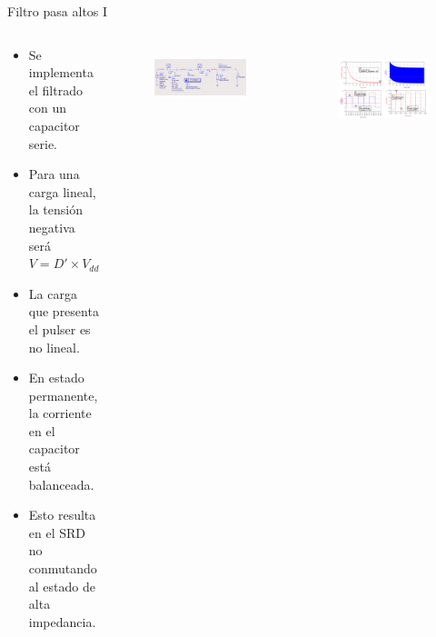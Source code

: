\documentclass{beamer}
\begin{document}
\begin{frame}{Filtro pasa altos I}

    \begin{columns}[c]
        \begin{block}{}
            \begin{itemize}
                \item Se implementa el filtrado con un capacitor serie.
                \item Para una carga lineal, la tensión negativa será $V = D' \times V_{dd}$
                \item La carga que presenta el pulser es no lineal.
                \item En estado permanente, la corriente en el capacitor está
                    balanceada.
                \item Esto resulta en el SRD no conmutando al estado de alta
                    impedancia.
            \end{itemize}
        \end{block}
        \begin{figure}[tbp]
            \centering
            \includegraphics[width=\textwidth]{images/highpass_filter_nonlinear_load_sch.png}
            \label{fig:highpass_filter_nonlinear_load_sch}
        \end{figure}

        \begin{figure}[tbp]
            \centering
            \includegraphics[width=\textwidth]{images/highpass_filter_nonlinear_load_sim_result.png}
            \label{fig:highpass_filter_nonlinear_load_sim_result}
        \end{figure}

    \end{columns}

\end{frame}
\end{document}
